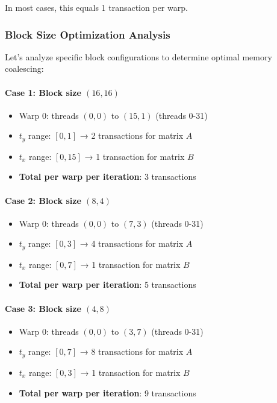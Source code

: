 \documentclass{amsbook}
\theoremstyle{definition}
\begin{document}
In most cases, this equals 1 transaction per warp.

\subsubsection{Block Size Optimization Analysis}

Let's analyze specific block configurations to determine optimal memory coalescing:

\paragraph{Case 1: Block size $(16, 16)$}
\begin{itemize}
\item Warp 0: threads $(0,0)$ to $(15,1)$ (threads 0-31)
\item $t_y$ range: $[0, 1]$ → 2 transactions for matrix $A$
\item $t_x$ range: $[0, 15]$ → 1 transaction for matrix $B$
\item \textbf{Total per warp per iteration}: 3 transactions
\end{itemize}

\paragraph{Case 2: Block size $(8, 4)$}
\begin{itemize}
\item Warp 0: threads $(0,0)$ to $(7,3)$ (threads 0-31)
\item $t_y$ range: $[0, 3]$ → 4 transactions for matrix $A$
\item $t_x$ range: $[0, 7]$ → 1 transaction for matrix $B$
\item \textbf{Total per warp per iteration}: 5 transactions
\end{itemize}

\paragraph{Case 3: Block size $(4, 8)$}
\begin{itemize}
\item Warp 0: threads $(0,0)$ to $(3,7)$ (threads 0-31)
\item $t_y$ range: $[0, 7]$ → 8 transactions for matrix $A$
\item $t_x$ range: $[0, 3]$ → 1 transaction for matrix $B$
\item \textbf{Total per warp per iteration}: 9 transactions
\end{itemize}
\end{document}
